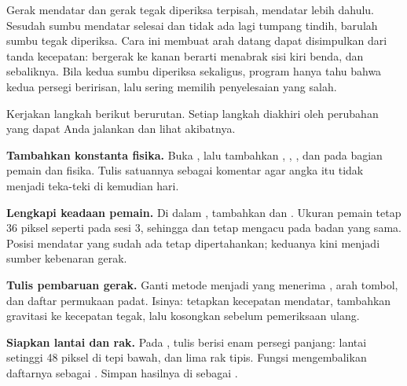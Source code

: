 Gerak mendatar dan gerak tegak diperiksa terpisah, mendatar lebih dahulu.
Sesudah sumbu mendatar selesai dan tidak ada lagi tumpang tindih, barulah
sumbu tegak diperiksa. Cara ini membuat arah datang dapat disimpulkan dari
tanda kecepatan: bergerak ke kanan berarti menabrak sisi kiri benda, dan
sebaliknya. Bila kedua sumbu diperiksa sekaligus, program hanya tahu bahwa
kedua persegi beririsan, lalu sering memilih penyelesaian yang salah.


Kerjakan langkah berikut berurutan. Setiap langkah diakhiri oleh perubahan
yang dapat Anda jalankan dan lihat akibatnya.

\begin{langkah}
  \item \textbf{Tambahkan konstanta fisika.} Buka
        , lalu tambahkan , , ,
        dan  pada bagian pemain dan fisika.
        Tulis satuannya sebagai komentar agar angka itu tidak menjadi teka-teki
        di kemudian hari.

  \item \textbf{Lengkapi keadaan pemain.} Di dalam ,
        tambahkan  dan
        . Ukuran pemain tetap 36 piksel seperti
        pada sesi 3, sehingga  dan  tetap mengacu
        pada badan yang sama. Posisi mendatar yang sudah ada tetap
        dipertahankan; keduanya kini menjadi sumber kebenaran gerak.

  \item \textbf{Tulis pembaruan gerak.} Ganti metode  menjadi
         yang menerima , arah tombol, dan
        daftar permukaan padat. Isinya: tetapkan kecepatan mendatar, tambahkan
        gravitasi ke kecepatan tegak, lalu kosongkan  sebelum
        pemeriksaan ulang.

  \item \textbf{Siapkan lantai dan rak.} Pada ,
        tulis  berisi enam persegi panjang: lantai
        setinggi 48 piksel di tepi bawah, dan lima rak tipis. Fungsi
         mengembalikan daftarnya sebagai .
        Simpan hasilnya di  sebagai .


\end{langkah}
